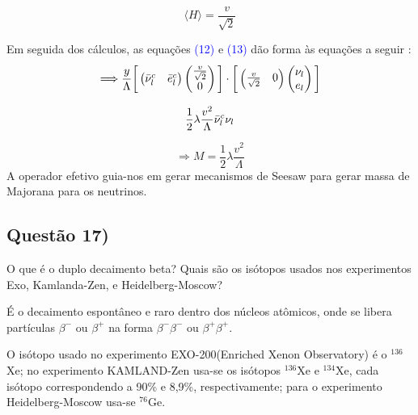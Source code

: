 \documentclass{article}
\begin{document}
 
 \begin{equation}
     \langle H \rangle = \frac{v}{\sqrt{2}}
 \end{equation}
 
 Em seguida dos cálculos, as equações \textcolor{blue}{(12)} e \textcolor{blue}{(13)} dão forma às equações a seguir : 
 \begin{equation}
     \Longrightarrow \frac{y}{\Lambda} \bigg[         \begin{pmatrix}             \Bar{\nu}_l^c &             \Bar{e}_l^c       \end{pmatrix}   \begin{pmatrix} \frac{v}{\sqrt{2}}\\0       \end{pmatrix} \bigg] \cdot \bigg[ \begin{pmatrix} \frac{v}{\sqrt{2}} & 0   \end{pmatrix} 
         \begin{pmatrix} 
         \nu_l \\ e_l
         \end{pmatrix} 
         \bigg]
 \end{equation}
 
 \begin{equation}
     \frac{1}{2}\lambda \frac{v^2}{\Lambda}\Bar{\nu}_l^c \nu_l
 \end{equation}

 \begin{equation}
\Longrightarrow 
     M = \frac{1}{2}\lambda \frac{v^2}{\Lambda}
 \end{equation}
  A operador efetivo guia-nos em gerar mecanismos de Seesaw para gerar massa de Majorana para os neutrinos.

\subsection*{Questão 17)}
\begin{boxx}
O que é o duplo decaimento beta? Quais são os isótopos usados nos experimentos Exo, Kamlanda-Zen, e Heidelberg-Moscow?
\end{boxx}
 É o decaimento espontâneo e raro dentro dos núcleos atômicos, onde se libera partículas $\beta^-$ ou $\beta^+$ na forma $\beta^-\beta^-$ ou $\beta^+\beta^+$.
 
  O isótopo usado no experimento EXO-200(Enriched Xenon Observatory) é o $^{136}$Xe; no experimento KAMLAND-Zen usa-se os isótopos $^{136}$Xe e $^{134}$Xe, cada isótopo correspondendo a 90\% e 8,9\%, respectivamente; para o experimento Heidelberg-Moscow usa-se $^{76}$Ge.  
  
\end{document}
